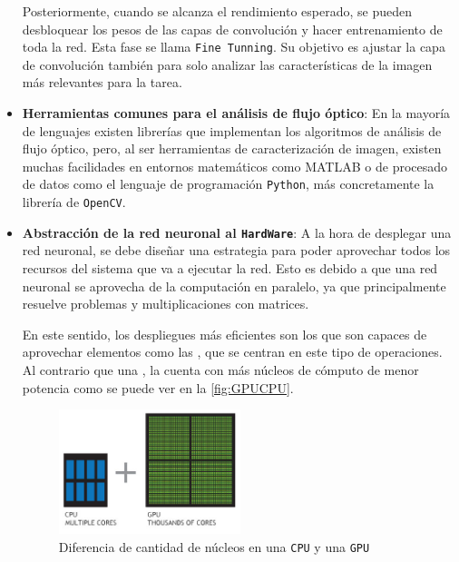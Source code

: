 \begin{itemize}
    Posteriormente, cuando se alcanza el rendimiento esperado, se pueden desbloquear los pesos de las capas de convolución y hacer entrenamiento de toda la red. Esta fase se llama \texttt{Fine Tunning}. 
    Su objetivo es ajustar la capa de convolución también para solo analizar las características de la imagen más relevantes para la tarea.
    \item \textbf{Herramientas comunes para el análisis de flujo óptico}: En la mayoría de lenguajes existen librerías que implementan los algoritmos de análisis de flujo óptico, pero, al ser herramientas de 
    caracterización de imagen, existen muchas facilidades en entornos matemáticos como MATLAB o de procesado de datos como el lenguaje de programación \texttt{Python}, más concretamente la librería de \texttt{OpenCV}.
    
    \clearpage
    
    \item \textbf{Abstracción de la red neuronal al \texttt{HardWare}}: A la hora de desplegar una red neuronal, se debe diseñar una estrategia para 
    poder aprovechar todos los recursos del sistema que va a ejecutar la red. Esto es debido a que una red neuronal se aprovecha de la computación en paralelo, ya que principalmente 
    resuelve problemas y multiplicaciones con matrices.

    En este sentido, los despliegues más eficientes son los que son capaces de aprovechar elementos como las \texttt{}, que se centran en este tipo de operaciones. Al contrario 
    que una \texttt{}, la \texttt{} cuenta con más núcleos de cómputo de menor potencia como se puede ver en la \autoref{fig:GPUCPU}.

    \begin{figure}[H]
        \centering
        \includegraphics[width=0.5\textwidth]{images/4/GPUCores.jpg}
        \caption{Diferencia de cantidad de núcleos en una \texttt{CPU} y una \texttt{GPU}\cite{GPUVsCPU}}
        \label{fig:GPUCPU}
    \end{figure}


\end{itemize}
